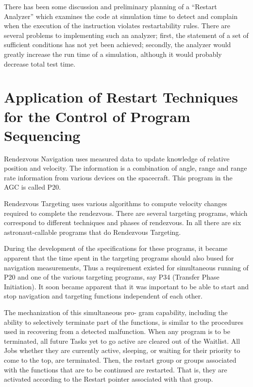 \documentclass[oxford]{ahsan}
\begin{document}
There has been some discussion and preliminary planning of a “Restart Analyzer” which
examines the code at simulation time to detect and complain when the execution of the
instruction violates restartability rules. There are several problems to implementing
such an analyzer; first, the statement of a set of sufficient conditions has not yet
been achieved; secondly, the analyzer would greatly increase the run time of a
simulation, although it would probably decrease total test time.


\section{Application  of Restart Techniques for the Control of Program Sequencing}

Rendezvous Navigation uses measured data to update knowledge of relative position and
velocity. The information is a combination of angle, range and range rate information
from various devices on the spacecraft. This program in the AGC is called P20.

Rendezvous Targeting uses various algorithms to compute velocity changes required to
complete the rendezvous. There are several targeting programs, which correspond to
different techniques and phases of rendezvous. In all there are six astronaut-callable
programs that do Rendezvous Targeting.

During the development of the specifications for these programs, it became apparent
that the time spent in the targeting programs should also bused for navigation
measurements, Thus a requirement existed for simultaneous running of P20  and  one of
the various targeting programs, say P34 (Transfer Phase Initiation). It soon became
apparent that it was important to be able to start and stop navigation and targeting
functions independent of each other.

The mechanization of this simultaneous pro- gram capability, including the ability to
selectively terminate part of the functions, is similar to the procedures used in
recovering from a detected malfunction. When any program is to be terminated, all
future Tasks yet to go active are cleared out of the Waitlist. All Jobs whether they
are currently active, sleeping, or waiting for their priority to come to the top, are
terminated. Then, the restart group or groups associated with the functions that are to
be continued are restarted. That is, they are activated according to the Restart
pointer associated with that group.
\end{document}
